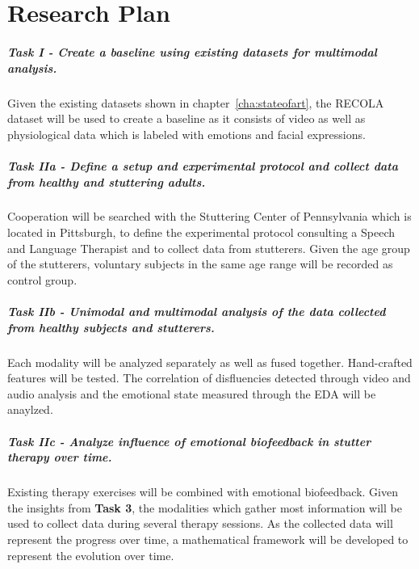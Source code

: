 \chapter{Research Plan}
\label{cha:plan}


\paragraph{Task I - Create a baseline using existing datasets for multimodal analysis.}
Given the existing datasets shown in chapter~\ref{cha:stateofart}, the RECOLA dataset will be used to create a baseline as it consists of video as well as physiological data which is labeled with emotions and facial expressions.

\paragraph{Task IIa - Define a setup and experimental protocol and collect data from healthy and stuttering adults.}
Cooperation will be searched with the Stuttering Center of Pennsylvania which is located in Pittsburgh, to define the experimental protocol consulting a Speech and Language Therapist and to collect data from stutterers. Given the age group of the stutterers, voluntary subjects in the same age range will be recorded as control group.

\paragraph{Task IIb - Unimodal and multimodal analysis of the data collected from healthy subjects and stutterers.} Each modality will be analyzed separately as well as fused together. Hand-crafted features will be tested. The correlation of disfluencies detected through video and audio analysis and the emotional state measured through the EDA will be anaylzed.

\paragraph{Task IIc - Analyze influence of emotional biofeedback in stutter therapy over time.} Existing therapy exercises will be combined with emotional biofeedback. Given the insights from \textbf{Task 3}, the modalities which gather most information   will be used to collect data during several therapy sessions. As the collected data will represent the progress over time, a mathematical framework will be developed to represent the evolution over time.

